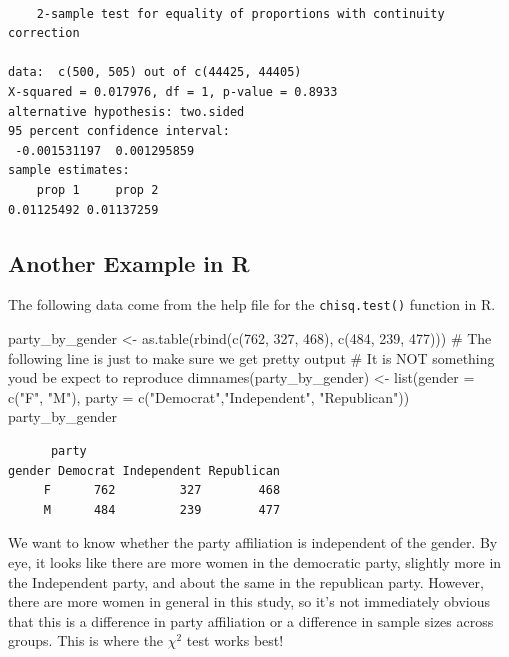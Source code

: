 \documentclass[
  letterpaper,
  DIV=11,
  numbers=noendperiod,
  oneside]{scrreprt}
\newenvironment{Shaded}{\begin{snugshade}}{\end{snugshade}}
\newcommand{\AttributeTok}[1]{\textcolor[rgb]{0.40,0.45,0.13}{#1}}
\newcommand{\CommentTok}[1]{\textcolor[rgb]{0.37,0.37,0.37}{#1}}
\newcommand{\DecValTok}[1]{\textcolor[rgb]{0.68,0.00,0.00}{#1}}
\newcommand{\FunctionTok}[1]{\textcolor[rgb]{0.28,0.35,0.67}{#1}}
\newcommand{\NormalTok}[1]{\textcolor[rgb]{0.00,0.23,0.31}{#1}}
\newcommand{\OtherTok}[1]{\textcolor[rgb]{0.00,0.23,0.31}{#1}}
\newcommand{\StringTok}[1]{\textcolor[rgb]{0.13,0.47,0.30}{#1}}
\begin{document}
\begin{verbatim}

    2-sample test for equality of proportions with continuity correction

data:  c(500, 505) out of c(44425, 44405)
X-squared = 0.017976, df = 1, p-value = 0.8933
alternative hypothesis: two.sided
95 percent confidence interval:
 -0.001531197  0.001295859
sample estimates:
    prop 1     prop 2 
0.01125492 0.01137259 
\end{verbatim}

\hypertarget{another-example-in-r}{%
\subsection{Another Example in R}\label{another-example-in-r}}

The following data come from the help file for the \texttt{chisq.test()}
function in R.

\begin{Shaded}
\begin{Highlighting}[]
\NormalTok{party\_by\_gender }\OtherTok{\textless{}{-}} \FunctionTok{as.table}\NormalTok{(}\FunctionTok{rbind}\NormalTok{(}\FunctionTok{c}\NormalTok{(}\DecValTok{762}\NormalTok{, }\DecValTok{327}\NormalTok{, }\DecValTok{468}\NormalTok{), }\FunctionTok{c}\NormalTok{(}\DecValTok{484}\NormalTok{, }\DecValTok{239}\NormalTok{, }\DecValTok{477}\NormalTok{)))}
\CommentTok{\# The following line is just to make sure we get pretty output}
\CommentTok{\# It is NOT something you\textquotesingle{}d be expect to reproduce}
\FunctionTok{dimnames}\NormalTok{(party\_by\_gender) }\OtherTok{\textless{}{-}} \FunctionTok{list}\NormalTok{(}\AttributeTok{gender =} \FunctionTok{c}\NormalTok{(}\StringTok{"F"}\NormalTok{, }\StringTok{"M"}\NormalTok{),}
    \AttributeTok{party =} \FunctionTok{c}\NormalTok{(}\StringTok{"Democrat"}\NormalTok{,}\StringTok{"Independent"}\NormalTok{, }\StringTok{"Republican"}\NormalTok{))}
\NormalTok{party\_by\_gender}
\end{Highlighting}
\end{Shaded}

\begin{verbatim}
      party
gender Democrat Independent Republican
     F      762         327        468
     M      484         239        477
\end{verbatim}

We want to know whether the party affiliation is independent of the
gender. By eye, it looks like there are more women in the democratic
party, slightly more in the Independent party, and about the same in the
republican party. However, there are more women in general in this
study, so it's not immediately obvious that this is a difference in
party affiliation or a difference in sample sizes across groups. This is
where the \(\chi^2\) test works best!
\end{document}
